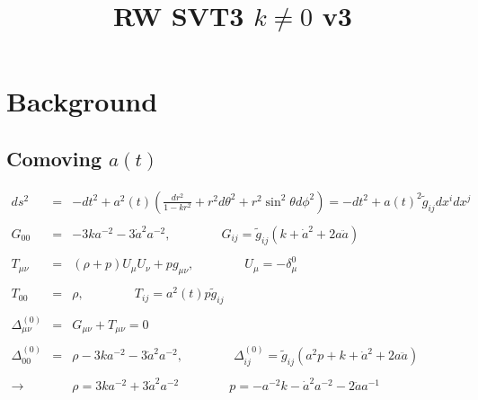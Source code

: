 \documentclass[10pt,letterpaper]{article}
\title{RW SVT3 $k\ne 0$ v3}
\date{}
\numberwithin{equation}{section}
\begin{document}
 
\maketitle
\noindent 
\section{Background}

\subsection{Comoving $a(t)$}
\begin{eqnarray}
ds^2 &=& -dt^2 + a^2(t)\left( \frac{dr^2}{1-kr^2} + r^2d\theta^2 + r^2\sin^2\theta d\phi^2\right) = -dt^2 + a(t)^2 \tilde g_{ij} dx^i dx^j
\\ \nonumber\\
G_{00} &=& -3k a^{-2} -3 \dot a^2 a^{-2},\qquad\qquad G_{ij} = \tilde g_{ij}(k + \dot a^2 + 2 a \ddot a)
\\ \nonumber\\
T_{\mu\nu} &=& (\rho+p)U_\mu U_\nu + p g_{\mu\nu},\qquad\qquad U_\mu = -\delta^0_\mu
\\ \nonumber\\
T_{00} &=& \rho,\qquad\qquad T_{ij} = a^2(t)p \tilde g_{ij}
\\ \nonumber\\
\Delta^{(0)}_{\mu\nu} &=& G_{\mu\nu}+ T_{\mu\nu} = 0
\\ \nonumber\\
\Delta^{(0)}_{00} &=& \rho- 3ka^{-2} -3 \dot a^2 a^{-2}, \qquad\qquad
\Delta^{(0)}_{ij} = \tilde g_{ij}( a^2 p +k + \dot a^2 + 2a \ddot a)
\\ \nonumber\\
\to  &&\boxed{\rho= 3k a^{-2} +3 \dot a^2 a^{-2}}
\qquad\qquad \boxed{p= -a^{-2} k - \dot a^2 a^{-2} -2 \ddot a a^{-1}}
\end{eqnarray}


\end{document}
